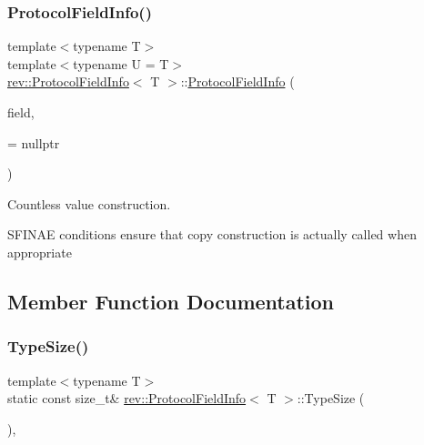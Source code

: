 \subsubsection{\texorpdfstring{ProtocolFieldInfo()}{ProtocolFieldInfo()}\hspace{0.1cm}{\footnotesize\ttfamily [3/3]}}
{\footnotesize\ttfamily template$<$typename T$>$ \\
template$<$typename U  = T$>$ \\
\mbox{\hyperlink{structrev_1_1_protocol_field_info}{rev\+::\+Protocol\+Field\+Info}}$<$ T $>$\+::\mbox{\hyperlink{structrev_1_1_protocol_field_info}{Protocol\+Field\+Info}} (\begin{DoxyParamCaption}\item[{U \&}]{field,  }\item[{typename std\+::enable\+\_\+if\+\_\+t$<$ is\+\_\+value\+\_\+type$<$ U $>$\+::value \&\&!std\+::is\+\_\+same$<$ U, \mbox{\hyperlink{structrev_1_1_protocol_field_info}{Protocol\+Field\+Info}}$<$ T $>$ $>$\+::value $>$ $\ast$}]{ = {\ttfamily nullptr} }\end{DoxyParamCaption})\hspace{0.3cm}{\ttfamily [inline]}}



Countless value construction. 

S\+F\+I\+N\+AE conditions ensure that copy construction is actually called when appropriate 

\subsection{Member Function Documentation}
\mbox{\label{structrev_1_1_protocol_field_info_a48e96e4c04c0a242bd87c5ef46f0b2b5}} 
\subsubsection{\texorpdfstring{TypeSize()}{TypeSize()}}
{\footnotesize\ttfamily template$<$typename T$>$ \\
static const size\+\_\+t\& \mbox{\hyperlink{structrev_1_1_protocol_field_info}{rev\+::\+Protocol\+Field\+Info}}$<$ T $>$\+::Type\+Size (\begin{DoxyParamCaption}{ }\end{DoxyParamCaption})\hspace{0.3cm}{\ttfamily [inline]}, {\ttfamily [static]}}




